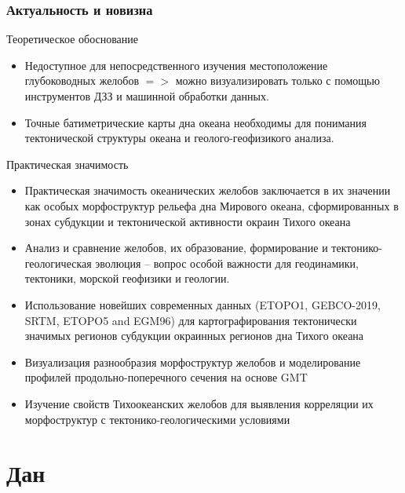 \documentclass[pdflatex,compress,8pt,
	xcolor={dvipsnames,dvipsnames,svgnames,x11names,table},
	hyperref={colorlinks = true,breaklinks = true, urlcolor = NavyBlue}]{beamer}
\begin{document}
\begin{frame}\frametitle{Актуальность и новизна}
\begin{exampleblock}{Теоретическое обоснование}
\begin{itemize}
            \item Недоступное для непосредственного изучения местоположение глубоководных желобов $=>$ можно визуализировать только с помощью инструментов ДЗЗ и машинной обработки данных.
            \item Точные батиметрические карты дна океана необходимы для понимания тектонической структуры океана и геолого-геофизикого анализа.         
\end{itemize}
\end{exampleblock}		
\begin{alertblock}{Практическая значимость}
\begin{itemize}
            \item Практическая значимость океанических желобов заключается в их значении как особых морфоструктур рельефа дна Мирового океана, сформированных в зонах субдукции и тектонической активности окраин Тихого океана
            \item Анализ и сравнение желобов, их образование, формирование и тектонико-геологическая эволюция – вопрос особой важности для геодинамики, тектоники, морской геофизики и геологии. 
            \item Использование новейших современных данных (ETOPO1, GEBCO-2019, SRTM, ETOPO5 and EGM96) для картографирования тектонически значимых регионов субдукции окраинных регионов дна Тихого океана 
             \item Визуализация разнообразия морфоструктур желобов и моделирование \\профилей продольно-поперечного сечения на основе GMT
             \item Изучение свойств Тихоокеанских желобов для выявления корреляции их морфоструктур с тектонико-геологическими условиями
\end{itemize}
\end{alertblock}		
\end{frame}

\section{Дан}
\end{document}
